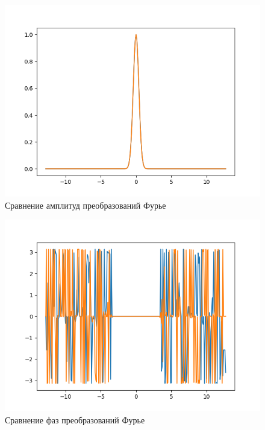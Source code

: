 {\begin{enumerate}
{			\begin{figure}[H]
				\begin{center}
				\includegraphics[scale=0.7]{gauss_compare_ampl}
				\caption{Сравнение амплитуд преобразований Фурье}
				\label{gauss_compare_ampl}
			\end{center}
			\end{figure}
		
		\begin{figure}[H]
			\begin{center}
			\includegraphics[scale=0.7]{gauss_compare_phase}
			\caption{Сравнение фаз преобразований Фурье}
			\label{gauss_compare_phase}
			\end{center}
		\end{figure}
			
}
\end{enumerate}}
